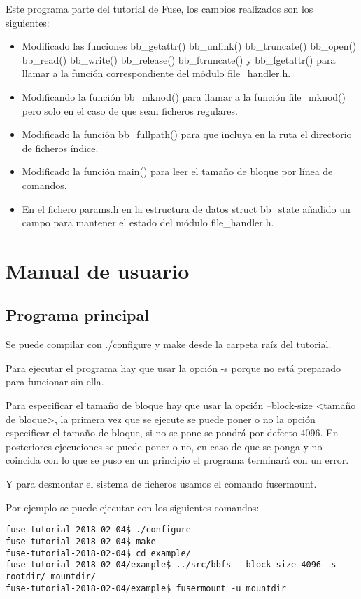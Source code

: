 \documentclass[a4paper,12pt]{article}
\begin{document}
Este programa parte del tutorial de Fuse, los cambios realizados son los siguientes:


\begin{itemize}
\item Modificado las funciones bb\_getattr() bb\_unlink() bb\_truncate() bb\_open() bb\_read() bb\_write() bb\_release() bb\_ftruncate() y bb\_fgetattr() para llamar a la función correspondiente del módulo file\_handler.h.
\item Modificando la función bb\_mknod() para llamar a la función file\_mknod() pero solo en el caso de que sean ficheros regulares.
\item Modificado la función bb\_fullpath() para que incluya en la ruta el directorio de ficheros índice.
\item Modificado la función main() para leer el tamaño de bloque por línea de comandos.
\item En el fichero params.h en la estructura de datos struct bb\_state añadido un campo para mantener el estado del módulo file\_handler.h.
\end{itemize}




\section{Manual de usuario}

\subsection{Programa principal}
Se puede compilar con ./configure y make desde la carpeta raíz del tutorial.
\bigskip

Para ejecutar el programa hay que usar la opción -s porque no está preparado para funcionar sin ella.
\bigskip

Para especificar el tamaño de bloque hay que usar la opción --block-size <tamaño de bloque>, la primera vez que se ejecute se puede poner o no la opción especificar el tamaño de bloque, si no se pone se pondrá por defecto 4096. En posteriores ejecuciones se puede poner o no, en caso de que se ponga y no coincida con lo que se puso en un principio el programa terminará con un error.
\bigskip

Y para desmontar el sistema de ficheros usamos el comando fusermount.
\bigskip

Por ejemplo se puede ejecutar con los siguientes comandos:

\begin{verbatim}
fuse-tutorial-2018-02-04$ ./configure 
fuse-tutorial-2018-02-04$ make
fuse-tutorial-2018-02-04$ cd example/
fuse-tutorial-2018-02-04/example$ ../src/bbfs --block-size 4096 -s rootdir/ mountdir/
fuse-tutorial-2018-02-04/example$ fusermount -u mountdir
\end{verbatim}
\end{document}
